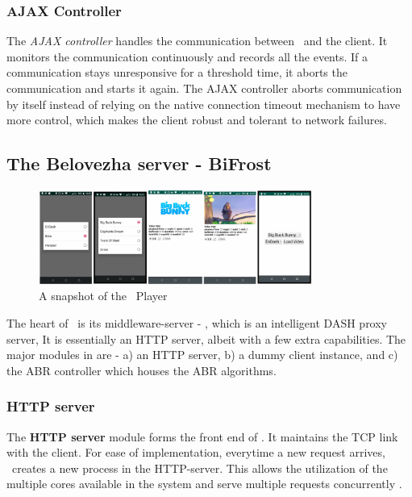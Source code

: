 \subsubsection{AJAX Controller}
The \textit{AJAX controller} handles the communication between \servname\ and the client. It monitors the communication continuously and records all the events. If a communication stays unresponsive for a threshold time, it aborts the communication and starts it again. The AJAX controller aborts communication by itself instead of relying on the native connection timeout mechanism to have more control, which makes the client robust and tolerant to network failures.
\subsection{The Belovezha server - BiFrost}
\begin{figure}[h]
    \centering
    \includegraphics[width=0.8\textwidth]{images/App_Specs.eps}
    \caption{A snapshot of the \bel\ Player}
    \label{fig:chap05:bel_client}
\end{figure}
 The heart of \bel\ is its middleware-server - \servname, which is an intelligent \ac{DASH} proxy server, It is essentially an HTTP server, albeit with a few extra capabilities. The major modules in \servname are -  a) an HTTP server,  b) a dummy client instance, and  c) the \ac{ABR} controller which houses the ABR algorithms.
\subsubsection{HTTP server}
The \textbf{HTTP server} module forms the front end of \servname. It maintains the TCP link with the client. For ease of implementation, everytime a new request arrives, \servname\ creates a new process in the HTTP-server. This allows the utilization of the multiple cores available in the system and serve multiple requests concurrently .

